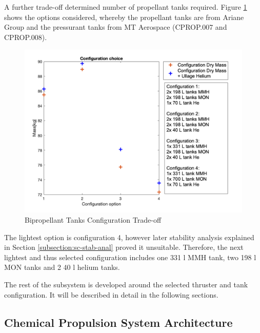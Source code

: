 \documentclass[conference]{IEEEtran}
\begin{document}
A further trade-off determined number of propellant tanks required. Figure \ref{fig:biprop-tank-config} shows the options considered, whereby the propellant tanks are from Ariane Group and the pressurant tanks from MT Aerospace (CPROP.007 and CPROP.008).
\begin{figure} [H]
    \centering
    \includegraphics[width=\linewidth]{img/BipropConfig.png}
    \caption{Bipropellant Tanks Configuration Trade-off}
    \label{fig:biprop-tank-config}
\end{figure}
The lightest option is configuration 4, however later stability analysis explained in Section \ref{subsection:sc-stab-anal} proved it unsuitable. Therefore, the next lightest and thus selected configuration includes one 331 l MMH tank, two 198 l MON tanks and 2 40 l helium tanks. 

The rest of the subsystem is developed around the selected thruster and tank configuration. It will be described in detail in the following sections.


\subsection{Chemical Propulsion System Architecture}
\end{document}
